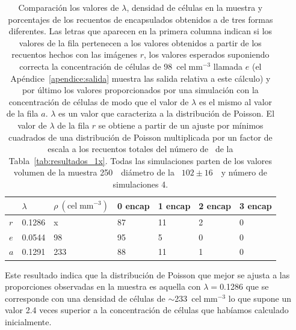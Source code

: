 \begin{spacing}{1}
\begin{table}[H]
\renewcommand\tablename{Tabla}
\renewcommand{\arraystretch}{1.5}
\centering
    
    \setlength{\extrarowheight}{-2pt}
    \begin{tabular}{C{1cm} C{1.5cm} C{2.2cm} C{1.5cm} C{1.5cm} C{1.5cm} C{1.5cm}}
        \hline
         & $\lambda$ & \small{$\rho\:(\mathrm{cel\;{mm}^{-3}})$} & 0 encap & 1 encap & 2 encap & 3 encap\\
        \hline
        \hline
        
        $r$ & 0.1286 & x & 87 & 11 & 2 & 0 \\
        $e$ & 0.0544 & 98 & 95 & 5 & 0 & 0 \\
        $a$ & 0.1291 & 233 & 88 & 11 & 1 & 0 \\
        
        \hline
    \end{tabular}

    \caption{\small Comparación los valores de $\lambda$, densidad de células en la muestra y porcentajes de los recuentos de encapsulados obtenidos a de tres formas diferentes. Las letras que aparecen en la primera columna indican si los valores de la fila pertenecen a los valores obtenidos a partir de los recuentos hechos con las imágenes $r$, los valores esperados suponiendo correcta la concentración de células de 98~$\mathrm{cel\;{mm}^{-3}}$ llamada $e$ (el Apéndice~\ref{apendice:salida} muestra las salida relativa a este cálculo) y por último los valores proporcionados por una simulación con la concentración de células de modo que el valor de $\lambda$ es el mismo al valor de la fila $a$. $\lambda$ es un valor que caracteriza a la distribución de Poisson. El valor de $\lambda$ de la fila $r$ se obtiene a partir de un ajuste por mínimos cuadrados de una distribución de Poisson multiplicada por un factor de escala a los recuentos totales del número de \gotas\ de la Tabla~\ref{tab:resultados_1x}. Todas las simulaciones parten de los valores volumen de la muestra 250~\milimetrocubico\ diámetro de la \gota\ $102\pm16$~\micrometro\ y número de simulaciones 4.}
    \label{tab:comparacion_porcentajes_1x}
    
\end{table}

\end{spacing}

Este resultado indica que la distribución de Poisson que mejor se ajusta a las proporciones observadas en la muestra es aquella con $\lambda=$0.1286 que se corresponde con una densidad de células de $\sim$233~$\mathrm{cel\;{mm}^{-3}}$ lo que supone un valor 2.4 veces superior a la concentración de células que habíamos calculado inicialmente. 

